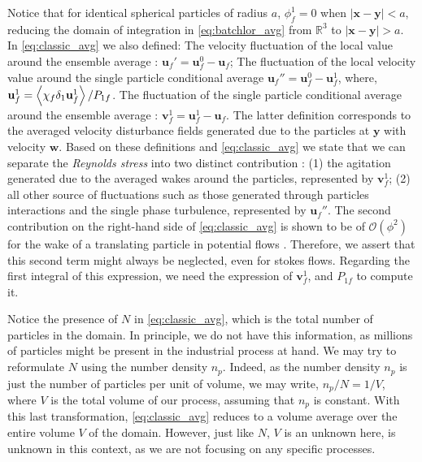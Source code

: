 Notice that for identical spherical particles of radius $a$, $\phi_f^1 = 0$ when $|\textbf{x}-\textbf{y}| < a$, reducing the domain of integration in \ref{eq:batchlor_avg} from $\mathbb{R}^3$ to $|\textbf{x}-\textbf{y}| > a$. 
In \ref{eq:classic_avg} we also defined: 
The velocity fluctuation of the local value around the ensemble average : $\textbf{u}_f' = \textbf{u}_f^0 - \textbf{u}_f$;
The fluctuation of the local velocity value around the single particle conditional average $\textbf{u}_f'' = \textbf{u}_f^0 - \textbf{u}_f^1$, where, $\textbf{u}_f^1 =\left<\chi_f \delta_1 \textbf{u}_f^1\right>/P_{1f}$.  
The fluctuation of the single particle conditional average around the ensemble average : $\textbf{v}_f^{1} = \textbf{u}_f^1 - \textbf{u}_f$.
The latter definition corresponds to the averaged velocity disturbance fields generated due to the particles at $\textbf{y}$ with velocity $\textbf{w}$. 
Based on these definitions and \ref{eq:classic_avg} we state that we can separate the \textit{Reynolds stress} into two distinct contribution :  (1) the agitation generated due to the averaged wakes around the particles, represented by $\textbf{v}_f^{1}$; (2) all other source of fluctuations such as those generated through particles interactions and the single phase turbulence, represented by $\textbf{u}_f''$. 
The second contribution on the right-hand side of \ref{eq:classic_avg} is shown to be of $\mathcal{O}(\phi^2)$ for the wake of a translating particle in potential flows \citet[Appendix A]{zhang1994averaged}.
Therefore, we assert that this second term might always be neglected, even for stokes flows. 
Regarding the first integral of this expression, we need the expression of $\textbf{v}_f^{1}$, and $P_{1f}$ to compute it.

Notice the presence of $N$ in \ref{eq:classic_avg}, which is the total number of particles in the domain. 
In principle, we do not have this information, as millions of particles might be present in the industrial process at hand. 
We may try to reformulate $N$ using the number density $n_p$. 
Indeed, as the number density $n_p$ is just the number of particles per unit of volume, we may write, $n_p / N = 1/V$, where $V$ is the total volume of our process, assuming that $n_p$ is constant. 
With this last transformation, \ref{eq:classic_avg} reduces to a volume average over the entire volume $V$ of the domain. 
However, just like $N$, $V$ is an unknown here, is unknown in this context, as we are not focusing on any specific processes. 

